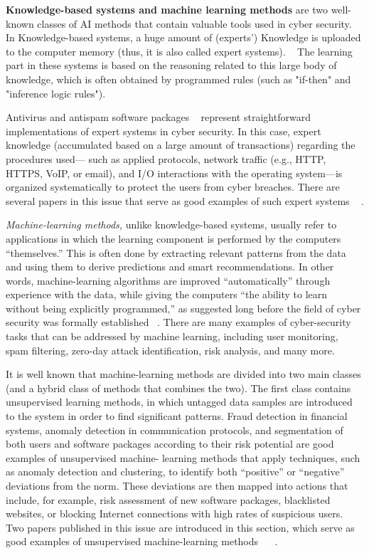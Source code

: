 \textbf{Knowledge-based systems and machine learning methods} are two well-known classes of AI methods that contain valuable tools
used in cyber security. In Knowledge-based systems, a huge amount of (experts') Knowledge is uploaded to the computer memory (thus, it is also called expert systems). ~\cite{Felgenbaum:1977:AAI:1622943.1623042}
The learning part in these systems is based on the reasoning related to this large body of knowledge, which is often obtained  by programmed rules (such as "if-then" and "inference logic rules").

Antivirus and antispam software packages ~\cite{Blanzieri:2008:SLT:1612711.1612715} represent straightforward
implementations of expert systems in cyber security. In this case, expert knowledge
(accumulated based on a large amount of transactions) regarding the procedures used—
such as applied protocols, network traffic (e.g., HTTP, HTTPS, VoIP, or email), and I/O
interactions with the operating system—is organized systematically to protect the
users from cyber breaches. There are several papers in this issue that serve as good
examples of such expert systems ~\cite{Maltinsky:2017:NNM:3055535.3040966} .


\textit{Machine-learning methods,} unlike knowledge-based systems, usually refer to applications in which the learning component is performed by the computers “themselves.”
This is often done by extracting relevant patterns from the data and using them to
derive predictions and smart recommendations. In other words, machine-learning algorithms are improved “automatically” through experience with the data, while giving
the computers “the ability to learn without being explicitly programmed,” as suggested
long before the field of cyber security was formally established ~\cite{Samuel:1959:SML:1661923.1661924}. There
are many examples of cyber-security tasks that can be addressed by machine learning,
including user monitoring, spam filtering, zero-day attack identification, risk analysis,
and many more.

It is well known that machine-learning methods are divided into two main classes
(and a hybrid class of methods that combines the two). The first class contains unsupervised learning methods, in which untagged data samples are introduced to the system
in order to find significant patterns. Fraud detection in financial systems, anomaly
detection in communication protocols, and segmentation of both users and software
packages according to their risk potential are good examples of unsupervised machine-
learning methods that apply techniques, such as anomaly detection and clustering, to
identify both “positive” or “negative” deviations from the norm. These deviations are
then mapped into actions that include, for example, risk assessment of new software
packages, blacklisted websites, or blocking Internet connections with high rates of suspicious users. Two papers published in this issue are introduced in this section, which
serve as good examples of unsupervised machine-learning methods ~\cite{Maltinsky:2017:NNM:3055535.3040966}
~\cite{Harel:2017:CSR:3055535.3057729}.


